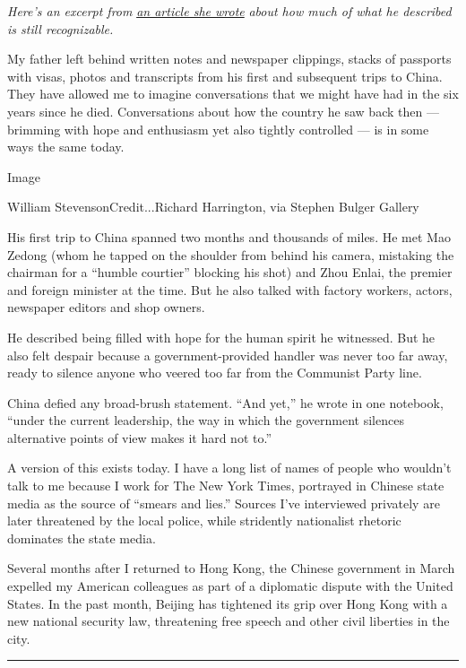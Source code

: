 \emph{Here's an excerpt from}
\href{https://www.nytimes.com/interactive/2020/07/30/world/asia/china-1950s-echoed-today.html}{\emph{an
article she wrote}} \emph{about how much of what he described is still
recognizable.}

My father left behind written notes and newspaper clippings, stacks of
passports with visas, photos and transcripts from his first and
subsequent trips to China. They have allowed me to imagine conversations
that we might have had in the six years since he died. Conversations
about how the country he saw back then --- brimming with hope and
enthusiasm yet also tightly controlled --- is in some ways the same
today.

Image

William StevensonCredit...Richard Harrington, via Stephen Bulger Gallery

His first trip to China spanned two months and thousands of miles. He
met Mao Zedong (whom he tapped on the shoulder from behind his camera,
mistaking the chairman for a ``humble courtier'' blocking his shot) and
Zhou Enlai, the premier and foreign minister at the time. But he also
talked with factory workers, actors, newspaper editors and shop owners.

He described being filled with hope for the human spirit he witnessed.
But he also felt despair because a government-provided handler was never
too far away, ready to silence anyone who veered too far from the
Communist Party line.

China defied any broad-brush statement. ``And yet,'' he wrote in one
notebook, ``under the current leadership, the way in which the
government silences alternative points of view makes it hard not to.''

A version of this exists today. I have a long list of names of people
who wouldn't talk to me because I work for The New York Times, portrayed
in Chinese state media as the source of ``smears and lies.'' Sources
I've interviewed privately are later threatened by the local police,
while stridently nationalist rhetoric dominates the state media.

Several months after I returned to Hong Kong, the Chinese government in
March expelled my American colleagues as part of a diplomatic dispute
with the United States. In the past month, Beijing has tightened its
grip over Hong Kong with a new national security law, threatening free
speech and other civil liberties in the city.

\begin{center}\rule{0.5\linewidth}{\linethickness}\end{center}

